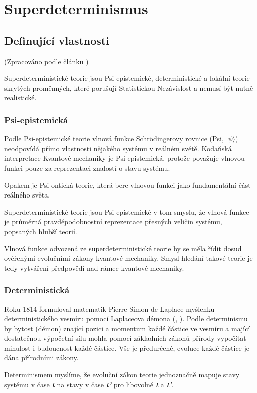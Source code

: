 \section{Superdeterminismus}
\subsection{Definující vlastnosti}
(Zpracováno podle článku \cite{supdet:rethink})

Superdeterministické teorie jsou Psi-epistemické, deterministické a lokální teorie skrytých proměnných, které porušují Statistickou Nezávislost a nemusí být nutně realistické.

\subsubsection{Psi-epistemická}
Podle Psi-epistemické teorie vlnová funkce Schrödingerovy rovnice (Psi, $|\psi\rangle$) neodpovídá přímo vlastnosti nějakého systému v reálném světě. Kodaňská interpretace Kvantové mechaniky je Psi-epistemická, protože považuje vlnovou funkci pouze za reprezentaci znalostí o stavu systému.

Opakem je Psi-ontická teorie, která bere vlnovou funkci jako fundamentální část reálného světa.

Superdeterministické teorie jsou Psi-epistemické v tom smyslu, že vlnová funkce je průměrná pravděpodobnostní reprezentace přesných veličin systému, popsaných hlubší teorií.

Vlnová funkce odvozená ze superdeterministické teorie by se měla řídit dosud ověřenými evolučními zákony kvantové mechaniky. Smysl hledání takové teorie je tedy vytváření předpovědí nad rámec kvantové mechaniky.

\subsubsection{Deterministická}
Roku 1814 formuloval matematik Pierre-Simon de Laplace myšlenku deterministického vesmíru pomocí Laplaceova démona (, \cite*{laplace:demon}). Podle determinismu by bytost (démon) znající pozici a momentum každé částice ve vesmíru a mající dostatečnou výpočetní sílu mohla pomocí základních zákonů přírody vypočítat minulost i budoucnost každé částice. Vše je předurčené, evoluce každé částice je dána přírodními zákony.

Determinismem myslíme, že evoluční zákon teorie jednoznačně mapuje stavy systému v čase \textbf{\emph{t}} na stavy v čase \textbf{\emph{t'}} pro libovolné \textbf{\emph{t}} a \textbf{\emph{t'}}.

